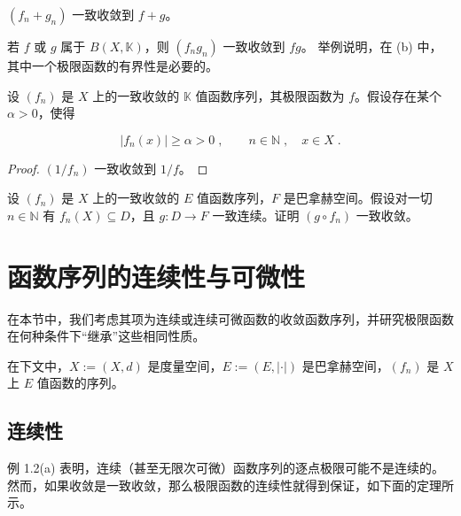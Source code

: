 \begin{exercises}
\begin{items}
$(f_{n} + g_{n})$ 一致收敛到 $f + g$。

\item

若 $f$ 或 $g$ 属于 $B(X,\mathbb{K})$，则 $(f_{n}g_{n})$ 一致收敛到 $fg$。
举例说明，在 (b) 中，其中一个极限函数的有界性是必要的。

\end{items}

\item

设 $(f_n)$ 是 $X$ 上的一致收敛的 $\mathbb{K}$ 值函数序列，其极限函数为 $f$。假设存在某个 $\alpha > 0$，使得

\[
|f_{n}(x)|\geq\alpha>0\;,\qquad n\in\mathbb{N}\;,\quad x\in X\;.
\]
\end{exercises}

\begin{proof}

$(1/f_{n})$ 一致收敛到 $1/f$。

\end{proof}

\begin{exercises}
\item[9.]

设 $(f_n)$ 是 $X$ 上的一致收敛的 $E$ 值函数序列，$F$ 是巴拿赫空间。假设对一切 $n \in \mathbb{N}$ 有 $f_n(X) \subseteq D$，且 $g: D \to F$ 一致连续。证明 $(g \circ f_n)$ 一致收敛。

\end{exercises}

\section{函数序列的连续性与可微性}

在本节中，我们考虑其项为连续或连续可微函数的收敛函数序列，并研究极限函数在何种条件下“继承”这些相同性质。

在下文中，$ X := (X, d) $ 是度量空间，$ E := (E, |\cdot|) $ 是巴拿赫空间，$ (f_n) $ 是 $ X $ 上 $ E $ 值函数的序列。

\subsection*{连续性}

例 1.2(a) 表明，连续（甚至无限次可微）函数序列的逐点极限可能不是连续的。然而，如果收敛是一致收敛，那么极限函数的连续性就得到保证，如下面的定理所示。

